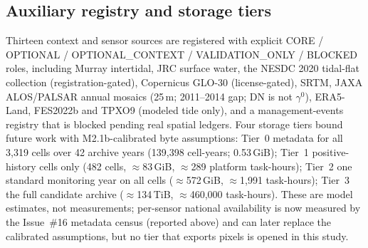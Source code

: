 \begin{figure}[t]\centering
{}
\label{fig:national}
\end{figure}

\subsection{Auxiliary registry and storage tiers}
Thirteen context and sensor sources are registered with explicit
CORE / OPTIONAL / OPTIONAL\_CONTEXT / VALIDATION\_ONLY / BLOCKED roles,
including Murray intertidal, JRC surface water, the NESDC 2020 tidal-flat
collection (registration-gated), Copernicus GLO-30 (license-gated),
SRTM, JAXA ALOS/PALSAR annual mosaics (25\,m; 2011--2014 gap; DN is not
$\gamma^0$), ERA5-Land, FES2022b and TPXO9 (modeled tide only), and a
management-events registry that is blocked pending real spatial ledgers.
Four storage tiers bound future work with M2.1b-calibrated byte
assumptions: Tier~0 metadata for all 3{,}319 cells over 42 archive
years (139{,}398 cell-years; 0.53\,GiB); Tier~1 positive-history cells
only (482 cells, $\approx$83\,GiB, $\approx$289 platform task-hours);
Tier~2 one standard monitoring year on all cells ($\approx$572\,GiB,
$\approx$1{,}991 task-hours); Tier~3 the full candidate archive
($\approx$134\,TiB, $\approx$460{,}000 task-hours). These are
model estimates, not measurements; per-sensor national availability is
now measured by the Issue~\#16 metadata census (reported above) and
can later replace the calibrated assumptions, but no tier that exports
pixels is opened in this study.

